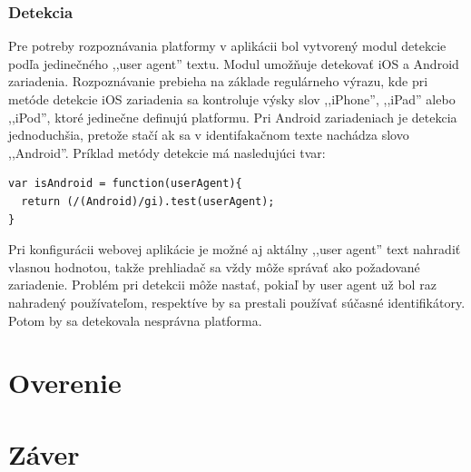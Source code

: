 \subsubsection{Detekcia} %
\label{ssub:detekcia}

Pre potreby rozpoznávania platformy v aplikácii bol vytvorený modul detekcie podľa jedinečného ,,user agent'' textu. Modul umožňuje detekovať iOS a Android zariadenia. Rozpoznávanie prebieha na základe regulárneho výrazu, kde pri metóde detekcie iOS zariadenia sa kontroluje výsky slov ,,iPhone'', ,,iPad'' alebo ,,iPod'', ktoré jedinečne definujú platformu. Pri Android zariadeniach je detekcia jednoduchšia, pretože stačí ak sa v identifakačnom texte nachádza slovo ,,Android''. Príklad metódy detekcie má nasledujúci tvar:

\begin{lstlisting}
var isAndroid = function(userAgent){
  return (/(Android)/gi).test(userAgent);
}
\end{lstlisting}

Pri konfigurácii webovej aplikácie je možné aj aktálny ,,user agent'' text nahradiť vlasnou hodnotou, takže prehliadač sa vždy môže správať ako požadované zariadenie. Problém pri detekcii môže nastať, pokiaľ by user agent už bol raz nahradený používateľom, respektíve by sa prestali používať súčasné identifikátory. Potom by sa detekovala nesprávna platforma.




\section{Overenie} %
\label{sec:overenie}


\section{Záver} %
\label{sec:z_ver}

